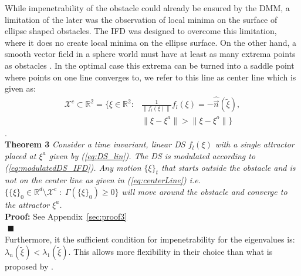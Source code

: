 While impenetrability of the obstacle could already be ensured by the DMM, a limitation of the later was the observation of local minima on the surface of ellipse shaped obstacles. The IFD was designed to overcome this limitation, where it does no create local minima on the ellipse surface. On the other hand, a smooth vector field in a sphere world must have at least as many extrema points as obstacles \cite{koditschek1990robot}. In the optimal case this extrema can be turned into a saddle point where points on one line converges to, we refer to this line as center line which is given as:
\begin{equation}
  \begin{split}
  \mathcal{X}^c \subset \mathbb{R}^2 = \{\xi \in \mathbb{R}^2: &\frac{1}{\|f_l(\xi)\|} f_l(\xi) = - \hat{\vec n}(\tilde \xi),\\
  & \|\xi - \xi^a\| > \| \xi - \xi^o\| \} \label{eq:centerLine}
  \end{split}
\end{equation}.\\

\noindent \textbf{Theorem 3}
\textit{Consider a time invariant, linear DS $f_l(\xi)$ with a single attractor placed at $\xi^a$ given by (\ref{eq:DS_lin}). The DS is modulated according to (\ref{eq:modulatedDS_IFD}). Any motion $\{\xi\}_t$ that starts outside the obstacle and is not on the center line as given in (\ref{eq:centerLine}) i.e. $\{ \{\xi\}_0 \in \mathbb{R}^d \setminus \mathcal{X}^c \; : \; \Gamma(\{\xi\}_0) \geq 0\}$ will move around the obstacle and converge to the attractor $\xi^a$.} \\
\textbf{Proof:} See Appendix~\ref{sec:proof3} \\
${}$ \hfill $\blacksquare$ \\
Furthermore, it the sufficient condition for impenetrability for the eigenvalues is:  $\lambda_n(\tilde \xi) < \lambda_1 (\tilde \xi)$. This allows more flexibility in their choice than what is proposed by \cite{khansari2012dynamical,}.




